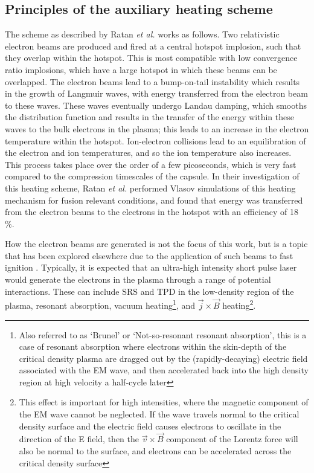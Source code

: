 \subsection{Principles of the auxiliary heating scheme}

The scheme as described by Ratan \textit{et al.} \cite{Ratan2017} works as follows. Two relativistic electron beams are produced and fired at a central hotspot implosion, such that they overlap within the hotspot. This is most compatible with low convergence ratio implosions, which have a large hotspot in which these beams can be overlapped. The electron beams lead to a bump-on-tail instability which results in the growth of Langmuir waves, with energy transferred from the electron beam to these waves. These waves eventually undergo Landau damping, which smooths the distribution function and results in the transfer of the energy within these waves to the bulk electrons in the plasma; this leads to an increase in the electron temperature within the hotspot. Ion-electron collisions lead to an equilibration of the electron and ion temperatures, and so the ion temperature also increases. This process takes place over the order of a few picoseconds, which is very fast compared to the compression timescales of the capsule. In their investigation of this heating scheme, Ratan \textit{et al.} performed Vlasov simulations of this heating mechanism for fusion relevant conditions, and found that energy was transferred from the electron beams to the electrons in the hotspot with an efficiency of 18 \%.

How the electron beams are generated is not the focus of this work, but is a topic that has been explored elsewhere due to the application of such beams to fast ignition \cite{Tabak2005, Kemp2014}. Typically, it is expected that an ultra-high intensity short pulse laser would generate the electrons in the plasma through a range of potential interactions. These can include SRS and TPD in the low-density region of the plasma,  resonant absorption, vacuum heating\footnote{Also referred to as `Brunel' or `Not-so-resonant resonant absorption', this is a case of resonant absorption where electrons within the skin-depth of the critical density plasma are dragged out by the (rapidly-decaying) electric field associated with the EM wave, and then accelerated back into the high density region at high velocity a half-cycle later}, and $\vec{j} \times \vec{B}$ heating\footnote{This effect is important for high intensities, where the magnetic component of the EM wave cannot be neglected. If the wave travels normal to the critical density surface and the electric field causes electrons to oscillate in the direction of the E field, then the $\vec{v} \times \vec{B}$ component of the Lorentz force will also be normal to the surface, and electrons can be accelerated across the critical density surface}\cite{Wilks1997}.

